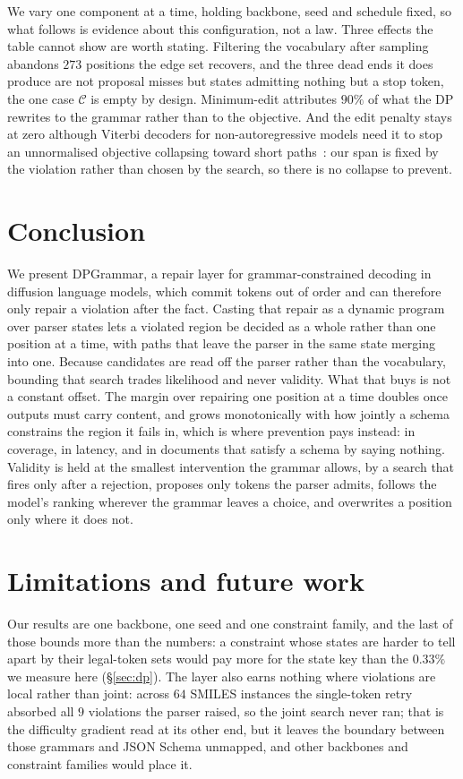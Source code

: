 \documentclass{article}
\begin{document}
We vary one component at a time, holding backbone, seed and schedule fixed, so what follows is evidence about this configuration, not a law. Three effects
the table cannot show are worth stating. Filtering the vocabulary after
sampling abandons $273$ positions the edge set recovers, and the three dead ends it does
produce are not proposal misses but states admitting nothing but a stop token, the one case $\mathcal{C}$ is empty by design.
Minimum-edit attributes $90\%$ of what the DP rewrites to the grammar rather than
to the objective. And the edit penalty stays at zero although Viterbi decoders for
non-autoregressive models need it to stop an
unnormalised objective collapsing toward short
paths~\citep{shao2022viterbi,chen2024controldag}: our span is fixed by the
violation rather than chosen by the search, so there is no collapse to prevent.

\section{Conclusion}

We present DPGrammar, a repair layer for grammar-constrained decoding in
diffusion language models, which commit tokens out of order and can therefore
only repair a violation after the fact. Casting that repair as a dynamic program
over parser states lets a violated region be decided as a whole rather than one
position at a time, with paths that leave the parser in the same state merging
into one. Because candidates are read off the parser rather than the vocabulary,
bounding that search trades likelihood and never validity. What that buys is not
a constant offset. The margin over repairing one position at a time doubles once
outputs must carry content, and grows monotonically with how jointly a schema
constrains the region it fails in, which is where prevention pays instead: in
coverage, in latency, and in documents that satisfy a schema by saying nothing.
Validity is held at the smallest intervention the grammar allows, by a search
that fires only after a rejection, proposes only tokens the parser admits,
follows the model's ranking wherever the grammar leaves a choice, and overwrites
a position only where it does not.

\section{Limitations and future work}
\label{sec:limits}

Our results are one backbone, one seed and one constraint family, and the last of
those bounds more than the numbers: a constraint whose states are harder to tell
apart by their legal-token sets would pay more for the state key than the
$0.33\%$ we measure here (\S\ref{sec:dp}). The layer also earns nothing where
violations are local rather than joint: across $64$ SMILES instances the single-token retry absorbed all $9$ violations
the parser raised, so the joint search never ran; that is the difficulty gradient read at its other
end, but it leaves the boundary between those grammars and JSON Schema unmapped,
and other backbones and constraint families would place it.
\end{document}

